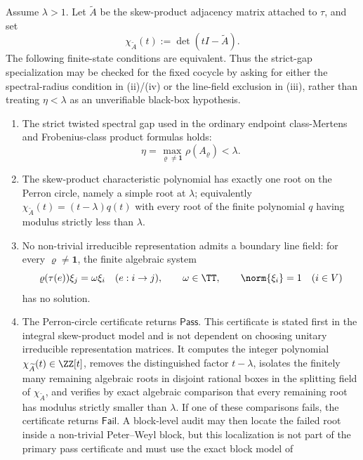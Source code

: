 \begin{proposition}
  \label{prop:eta-gap-finite-state-certificate}
  Assume \(\lambda>1\). Let \(\widetilde A\) be the skew-product
  adjacency matrix attached to \(\tau\), and set
  \[
    \chi_{\widetilde A}(t):=\det(tI-\widetilde A).
  \]
  The following finite-state conditions are equivalent.  Thus the strict-gap
  specialization may be checked for the fixed cocycle by asking for either the
  spectral-radius condition in \textup{(ii)}/\textup{(iv)} or the line-field
  exclusion in \textup{(iii)}, rather than treating \(\eta<\lambda\) as an
  unverifiable black-box hypothesis.
  \begin{enumerate}[label=\rm(\roman*)]
  \item The strict twisted spectral gap used in the ordinary endpoint
    class-Mertens and Frobenius-class product formulas holds:
    \[
      \eta=\max_{\varrho\neq\mathbf 1}\rho(A_\varrho)<\lambda .
    \]
  \item The skew-product characteristic polynomial has exactly one root on
    the Perron circle, namely a simple root at \(\lambda\); equivalently
    \(\chi_{\widetilde A}(t)=(t-\lambda)q(t)\) with every root of the
    finite polynomial \(q\) having modulus strictly less than \(\lambda\).
  \item No non-trivial irreducible representation admits a boundary line
    field: for every \(\varrho\neq\mathbf1\), the finite algebraic system
    \[
      \varrho(\tau(e))\xi_j=\omega\xi_i\quad(e:i\to j),
      \qquad \omega\in\TT,
      \qquad \norm{\xi_i}=1\quad(i\in V)
    \]
    has no solution.
  \item The Perron-circle certificate returns \(\mathsf{Pass}\).  This
    certificate is stated first in the integral skew-product model and is not
    dependent on choosing unitary irreducible representation matrices.  It
    computes the integer polynomial
    \(\chi_{\widetilde A}(t)\in\ZZ[t]\), removes the distinguished factor
    \(t-\lambda\), isolates the finitely many remaining algebraic roots in
    disjoint rational boxes in the splitting field of
    \(\chi_{\widetilde A}\), and verifies by exact algebraic comparison that
    every remaining root has modulus strictly smaller than \(\lambda\).  If
    one of these comparisons fails, the certificate returns
    \(\mathsf{Fail}\).  A block-level audit may then locate the failed root
    inside a non-trivial Peter--Weyl block, but this localization is not part
    of the primary pass certificate and must use the exact block model of

\end{enumerate}
\end{proposition}
